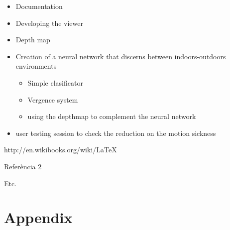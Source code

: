 \documentclass[10pt,a4paper,twocolumn,twoside]{article}
\begin{document}
\begin{itemize}
	\item Documentation 
	\item Developing the viewer
	\item Depth map
	\item Creation of a neural network that discerns between indoors-outdoors environments
			\begin{itemize}
				\item Simple clasificator 
				\item Vergence system
				\item using the depthmap to complement the neural network
			\end{itemize}
	\item user testing session to check the reduction on the motion sickness
\end{itemize}

\begin{thebibliography}{11}
http://en.wikibooks.org/wiki/LaTeX

Referència 2

Etc.


\end{thebibliography}

\appendix

\section*{Appendix}
\end{document}
